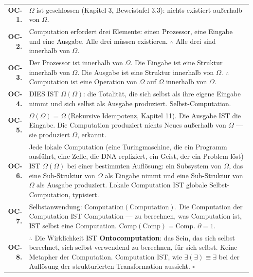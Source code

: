 \documentclass[10pt, openany, oneside]{book}
\renewcommand{\footnotesize}{\fontsize{8.5}{11}\selectfont}
\begin{document}
{\footnotesize
\noindent\begin{tabular}{r p{}}
\textbf{OC-1.} & $\Omega$ ist geschlossen (Kapitel 3, Beweistafel 3.3): nichts existiert außerhalb von $\Omega$. \\[0.3em]
\textbf{OC-2.} & Computation erfordert drei Elemente: einen Prozessor, eine Eingabe und eine Ausgabe. Alle drei müssen existieren. $\therefore$ Alle drei sind innerhalb von $\Omega$. \\[0.3em]
\textbf{OC-3.} & Der Prozessor ist innerhalb von $\Omega$. Die Eingabe ist eine Struktur innerhalb von $\Omega$. Die Ausgabe ist eine Struktur innerhalb von $\Omega$. $\therefore$ Computation ist eine Operation von $\Omega$ auf $\Omega$ innerhalb von $\Omega$. \\[0.3em]
\textbf{OC-4.} & DIES IST $\Omega(\Omega)$: die Totalität, die sich selbst als ihre eigene Eingabe nimmt und sich selbst als Ausgabe produziert. Selbst-Computation. \\[0.3em]
\textbf{OC-5.} & $\Omega(\Omega) = \Omega$ (Rekursive Idempotenz, Kapitel 11). Die Ausgabe IST die Eingabe. Die Computation produziert nichts Neues außerhalb von $\Omega$ --- sie produziert $\Omega$, erkannt. \\[0.3em]
\textbf{OC-6.} & Jede lokale Computation (eine Turingmaschine, die ein Programm ausführt, eine Zelle, die DNA repliziert, ein Geist, der ein Problem löst) IST $\Omega(\Omega)$ bei einer bestimmten Auflösung: ein Subsystem von $\Omega$, das eine Sub-Struktur von $\Omega$ als Eingabe nimmt und eine Sub-Struktur von $\Omega$ als Ausgabe produziert. Lokale Computation IST globale Selbst-Computation, typisiert. \\[0.3em]
\textbf{OC-7.} & Selbstanwendung: $\text{Computation}(\text{Computation})$. Die Computation der Computation IST Computation --- zu berechnen, was Computation ist, IST selbst eine Computation. $\text{Comp}(\text{Comp}) = \text{Comp}$. $\partial = 1$. \\[0.3em]
\textbf{OC-8.} & $\therefore$ Die Wirklichkeit IST \textbf{Ontocomputation}: das Sein, das sich selbst berechnet, sich selbst verwendend zu berechnen, für sich selbst. Keine Metapher der Computation. Computation IST, wie $\exists(\exists) \equiv \exists$ bei der Auflösung der strukturierten Transformation aussieht. $\square$ \\[0.3em]
\end{tabular}
}

\vspace{0.8em}
\end{document}
